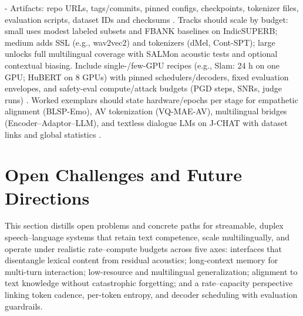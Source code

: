 \documentclass{article}
\begin{document}
- Artifacts: repo URLs, tags/commits, pinned configs, checkpoints, tokenizer files, evaluation scripts, dataset IDs and checksums \cite{sun2025llasofoundationalframeworkreproduciblere,vashishth2024stabspeechtokenizerassessmentbenchmark,maimon2025salmonsuiteacousticlanguagemodelevaluati}.
Tracks should scale by budget: small uses modest labeled subsets and FBANK baselines on IndicSUPERB; medium adds SSL (e.g., wav2vec2) and tokenizers (dMel, Cont-SPT); large unlocks full multilingual coverage with SALMon acoustic tests and optional contextual biasing. Include single-/few-GPU recipes (e.g., Slam: 24 h on one GPU; HuBERT on 8 GPUs) with pinned schedulers/decoders, fixed evaluation envelopes, and safety-eval compute/attack budgets (PGD steps, SNRs, judge runs) \cite{bai2025dmelspeechtokenizationmadesimple,li2025continuousspeechtokenizertext,maimon2025salmonsuiteacousticlanguagemodelevaluati,maimon2025slammingtrainingspeechlanguagemodelonegp,chen2023reducingbarriersselfsupervisedlearninghu,peri2024speechguardexploringadversarialrobustnes}. Worked exemplars should state hardware/epochs per stage for empathetic alignment (BLSP-Emo), AV tokenization (VQ-MAE-AV), multilingual bridges (Encoder--Adaptor--LLM), and textless dialogue LMs on J-CHAT with dataset links and global statistics \cite{wang2024blspemotowardsempatheticlargespeechlangu,sadok2025vectorquantizedmaskedautoencoderaudiovis,li2025seewossubmissionmlcslmlessonslearnedspee,nakata2024jchatjapaneselargescalespokendialoguecor}.

















\section{Open Challenges and Future Directions} \label{sec:openchallengesandfuturedirections}

This section distills open problems and concrete paths for streamable, duplex speech--language systems that retain text competence, scale multilingually, and operate under realistic rate--compute budgets across five axes: interfaces that disentangle lexical content from residual acoustics; long-context memory for multi-turn interaction; low-resource and multilingual generalization; alignment to text knowledge without catastrophic forgetting; and a rate--capacity perspective linking token cadence, per-token entropy, and decoder scheduling with evaluation guardrails.
\end{document}
